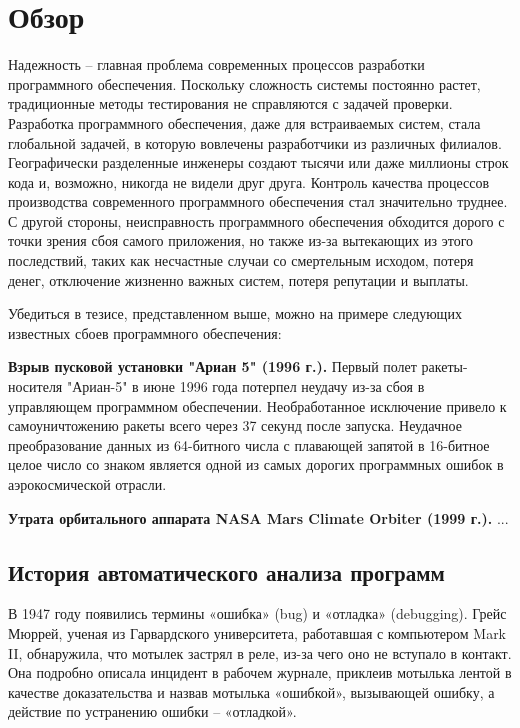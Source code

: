 \chapter{Обзор}\label{ch:ch1}
Надежность -- главная проблема современных процессов разработки программного обеспечения. Поскольку сложность системы постоянно растет, традиционные 
методы тестирования не справляются с задачей проверки. Разработка программного обеспечения, даже для встраиваемых систем, стала глобальной задачей, в 
которую вовлечены разработчики из различных филиалов. Географически разделенные инженеры создают тысячи или даже миллионы строк кода и, возможно, 
никогда не видели друг друга. Контроль качества процессов производства современного программного обеспечения стал значительно труднее. С другой стороны, 
неисправность программного обеспечения обходится дорого с точки зрения сбоя самого приложения, но также из-за вытекающих из этого последствий, таких как 
несчастные случаи со смертельным исходом, потеря денег, отключение жизненно важных систем, потеря репутации и выплаты.

Убедиться в тезисе, представленном выше, можно на примере следующих известных сбоев программного обеспечения:

\textbf{Взрыв пусковой установки "Ариан 5" (1996 г.).} Первый полет ракеты-носителя "Ариан-5" в июне 1996 года потерпел неудачу из-за сбоя в управляющем 
программном обеспечении. Необработанное исключение привело к самоуничтожению ракеты всего через 37 секунд после запуска. Неудачное преобразование 
данных из 64-битного числа с плавающей запятой в 16-битное целое число со знаком является одной из самых дорогих программных ошибок в аэрокосмической отрасли\cite{Lions1996ARIANE5F}.

\textbf{Утрата орбитального аппарата NASA Mars Climate Orbiter (1999 г.).} ... %

\section{История автоматического анализа программ}\label{sec:ch1/sec1}
В 1947 году появились термины «ошибка» (bug) и «отладка» (debugging). Грейс Мюррей, 
ученая из Гарвардского университета, работавшая с компьютером Mark II, обнаружила, 
что мотылек застрял в реле, из-за чего оно не вступало в контакт. Она подробно 
описала инцидент в рабочем журнале, приклеив мотылька лентой в качестве доказательства и 
назвав мотылька «ошибкой», вызывающей ошибку, а действие по устранению ошибки -- «отладкой».


